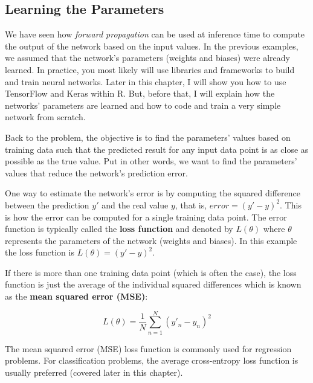 \documentclass[
  11pt,
]{krantz}
\makeatletter
\newenvironment{kframe}{%
\medskip{}
\setlength{\fboxsep}{.8em}
 \def\at@end@of@kframe{}%
 \ifinner\ifhmode%
  \def\at@end@of@kframe{\end{minipage}}%
  \begin{minipage}{\columnwidth}%
 \fi\fi%
 \def\FrameCommand##1{\hskip\@totalleftmargin \hskip-\fboxsep
 \colorbox{shadecolor}{##1}\hskip-\fboxsep
     \hskip-\linewidth \hskip-\@totalleftmargin \hskip\columnwidth}%
 \MakeFramed {\advance\hsize-\width
   \@totalleftmargin\z@ \linewidth\hsize
   \@setminipage}}%
 {\par\unskip\endMakeFramed%
 \at@end@of@kframe}
\newenvironment{rmdblock}[1]
  {
  \begin{itemize}
  \renewcommand{\labelitemi}{
    \raisebox{-.7\height}[0pt][0pt]{
      {\setkeys{Gin}{width=3em,keepaspectratio}\texttt{[image: images/icons/\#1]}}
    }
  }
  \setlength{\fboxsep}{1em}
  \begin{kframe}
  \item
  }
  {
  \end{kframe}
  \end{itemize}
  }
\newenvironment{rmdinfo}
  {\begin{rmdblock}{info}}
  {\end{rmdblock}}
\makeatother
\begin{document}
\hypertarget{learning-the-parameters}{%
\subsection{Learning the Parameters}\label{learning-the-parameters}}

We have seen how \emph{forward propagation} can be used at inference time to compute the output of the network based on the input values. In the previous examples, we assumed that the network's parameters (weights and biases) were already learned. In practice, you most likely will use libraries and frameworks to build and train neural networks. Later in this chapter, I will show you how to use TensorFlow and Keras within R. But, before that, I will explain how the networks' parameters are learned and how to code and train a very simple network from scratch.

Back to the problem, the objective is to find the parameters' values based on training data such that the predicted result for any input data point is as close as possible as the true value. Put in other words, we want to find the parameters' values that reduce the network's prediction error.

One way to estimate the network's error is by computing the squared difference between the prediction \(y'\) and the real value \(y\), that is, \(error = (y' - y)^2\). This is how the error can be computed for a single training data point. The error function is typically called the \textbf{loss function} and denoted by \(L(\theta)\) where \(\theta\) represents the parameters of the network (weights and biases). In this example the loss function is \(L(\theta)=(y'- y)^2\).

If there is more than one training data point (which is often the case), the loss function is just the average of the individual squared differences which is known as the \textbf{mean squared error (MSE)}:

\begin{equation}
  L(\theta) = \frac{1}{N} \sum_{n=1}^N{(y'_n - y_n)^2}
  \label{eq:lossMSE}
\end{equation}

\begin{rmdinfo}
The mean squared error (MSE) loss function is commonly used for regression problems. For classification problems, the average cross-entropy loss function is usually preferred (covered later in this chapter).
\end{rmdinfo}
\end{document}
